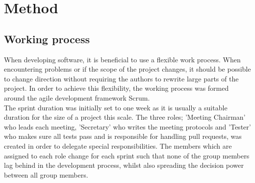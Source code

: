 \chapter{Method}





\section{Working process}
    
When developing software, it is beneficial to use a flexible work process. When encountering problems or if the scope of the project changes, it should be possible to change direction without requiring the authors to rewrite large parts of the project. In order to achieve this flexibility, the working process was formed around the agile development framework Scrum\cite{Scrum}.\\
    
The sprint duration was initially set to one week as it is usually a suitable duration for the size of a project this scale. The three roles; 'Meeting Chairman' who leads each meeting, 'Secretary' who writes the meeting protocols and 'Tester' who makes sure all tests pass and is responsible for handling pull requests, was created in order to delegate special responsibilities. The members which are assigned to each role change for each sprint such that none of the group members lag behind in the development process, whilst also spreading the decision power between all group members. \\
    
